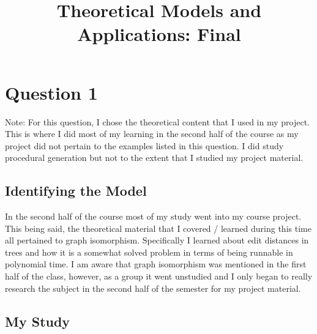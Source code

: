 \documentclass[conference]{IEEEtran}
\begin{document}
\title{Theoretical Models and Applications: Final}

\author{
}

\maketitle

\section{Question 1}

Note: For this question, I chose the theoretical content that I used in my project. This is where I did most of my learning in the
second half of the course as my project did not pertain to the examples listed in this question. I did study procedural generation
but not to the extent that I studied my project material. 

\subsection{Identifying the Model}

In the second half of the course most of my study went into my course project. This being said, the theoretical material that I
covered / learned during this time all pertained to graph isomorphism. Specifically I learned about edit distances in trees and how
it is a somewhat solved problem in terms of being runnable in polynomial time. I am aware that graph isomorphism was mentioned in
the first half of the class, however, as a group it went unstudied and I only began to really research the subject in the second
half of the semester for my project material.

\subsection{My Study}
\end{document}
